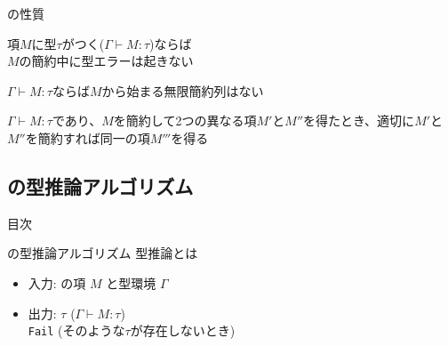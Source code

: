 \documentclass[dvipdfmx,aspectratio=169, 20pt]{beamer}
\begin{document}
\begin{frame}[fragile]{\LMD の性質}
    \begin{theorem}[型安全性]
        項\(M\)に型\(\tau\)がつく(\(\Gamma \vdash M : \tau \))ならば\\
        \(M\)の簡約中に型エラーは起きない
    \end{theorem}
    \begin{theorem}[強正規化性]
        \(\Gamma \vdash M : \tau \)ならば\(M\)から始まる無限簡約列はない
    \end{theorem}
    \begin{theorem}[合流性]
        \(\Gamma \vdash M : \tau \)であり、\(M\)を簡約して2つの異なる項\(M'\)と\(M''\)を得たとき、適切に\(M'\)と\(M''\)を簡約すれば同一の項\(M'''\)を得る
    \end{theorem}
\end{frame}

\subsection{\LMD の型推論アルゴリズム}

\begin{frame}{目次}
\end{frame}

\begin{frame}[fragile]{\LMD の型推論アルゴリズム}
    型推論とは
    \begin{itemize}
        \item 入力: \LMD の項 $M$ と型環境 $\Gamma$
        \item 出力: \( \tau \) \hspace{10mm} (\( \Gamma \vdash M : \tau \)) \\
            \hspace{10mm} \hspace{2mm} {\tt Fail} \hspace{1mm} (そのような\( \tau \)が存在しないとき)
    \end{itemize}

\end{frame}
\end{document}
